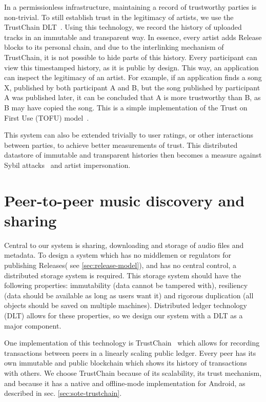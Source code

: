 In a permissionless infrastructure, maintaining a record of trustworthy parties is non-trivial. To still establish trust in the legitimacy of artists, we use the TrustChain DLT~\citep{otte2017trustchain}. Using this technology, we record the history of uploaded tracks in an immutable and transparent way. In essence, every artist adds Release blocks to its personal chain, and due to the interlinking mechanism of TrustChain, it is not possible to hide parts of this history. Every participant can view this timestamped history, as it is public by design. This way, an application can inspect the legitimacy of an artist. For example, if an application finds a song X, published by both participant A and B, but the song published by participant A was published later, it can be concluded that A is more trustworthy than B, as B may have copied the song. This is a simple implementation of the Trust on First Use (TOFU) model~\citep{toth2013public}.

This system can also be extended trivially to user ratings, or other interactions between parties, to achieve better measurements of trust. This distributed datastore of immutable and transparent histories then becomes a measure against Sybil attacks~\citep{douceur2002sybil} and artist impersonation.

\section{Peer-to-peer music discovery and sharing}
\label{sec:distributed-storage}
Central to our system is sharing, downloading and storage of audio files and metadata. To design a system which has no middlemen or regulators for publishing Releases( see \ref{sec:release-model}), and has no central control, a distributed storage system is required. This storage system should have the following properties: immutability (data cannot be tampered with), resiliency (data should be available as long as users want it) and rigorous duplication (all objects should be saved on multiple machines). Distributed ledger technology (DLT) allows for these properties, so we design our system with a DLT as a major component.

One implementation of this technology is TrustChain~\citep{otte2017trustchain} which allows for recording transactions between peers in a linearly scaling public ledger. Every peer has its own immutable and public blockchain which shows its history of transactions with others. We choose TrustChain because of its scalability, its trust mechanism, and because it has a native and offline-mode implementation for Android, as described in sec. \ref{sec:sote-trustchain}.

